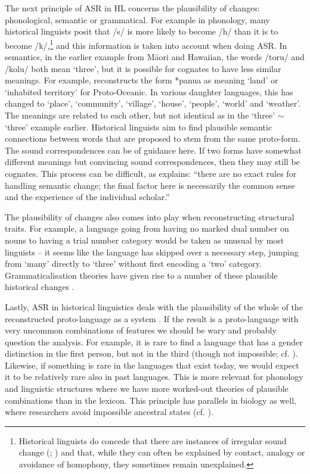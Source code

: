 \documentclass[12pt,letterpaper]{article}
\begin{document}
The next principle of ASR in HL concerns the plausibility of changes: phonological, semantic or grammatical. For example in phonology, many historical linguists posit that /s/ is more likely to become /h/ than it is to become /k/,\footnote{Historical linguists do concede that there are instances of irregular sound change (\citealt{blust1996neogrammarian}; \citealt{campbell1996sound}) and that, while they can often be explained by contact, analogy or avoidance of homophony, they sometimes remain unexplained.} and this information is taken into account when doing ASR. In semantics, in the earlier example from M\={a}ori and Hawaiian, the words /toru/ and /kolu/ both mean `three', but it is possible for cognates to have less similar meanings. For example, \citet{pawley2005meaning} reconstructs the form *panua as meaning `land' or `inhabited territory' for Proto-Oceanic. In various daughter languages, this has changed to `place', `community', `village', `house', `people', `world' and `weather'. The meanings are related to each other, but not identical as in the `three' $\sim$ `three' example earlier. Historical linguists aim to find plausible semantic connections between words that are proposed to stem from the same proto-form. The sound correspondences can be of guidance here. If two forms have somewhat different meanings but convincing sound correspondences, then they may still be cognates. This process can be difficult, as \citet[229]{anttila1989historical} explains: ``there are no exact rules for handling semantic change; the final factor here is necessarily the common sense and the experience of the individual scholar.''  

The plausibility of changes also comes into play when reconstructing structural traits. For example, a language going from having no marked dual number on nouns to having a trial number category would be taken as unusual by most linguists \citep[cf.][8]{kikusawa_2006_pro_number} -- it seems like the language has skipped over a necessary step, jumping from `many' directly to `three' without first encoding a `two' category. Grammaticalisation theories have given rise to a number of these plausible historical changes \citep[594--595, 598]{heine2003grammaticalization}.

Lastly, ASR in historical linguistics deals with the plausibility of the whole of the reconstructed proto-language as a system \citep[1]{clark1973aspects}. If the result is a proto-language with very uncommon combinations of features we should be wary and probably question the analysis. For example, it is rare to find a language that has a gender distinction in the first person, but not in the third (though not impossible; cf. \citealt{wals-44}). Likewise, if something is rare in the languages that exist today, we would expect it to be relatively rare also in past languages. This is more relevant for phonology and linguistic structures where we have more worked-out theories of plausible combinations than in the lexicon. This principle has parallels in biology as well, where researchers avoid impossible ancestral states (cf. \citealt{schulmeister2004comparative}).
\end{document}
